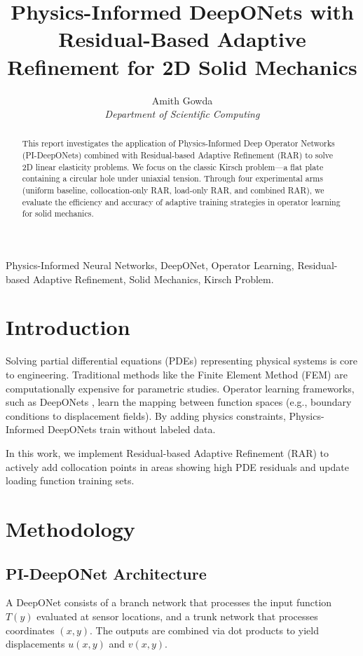 \documentclass[twocolumn,10pt,journal,compsoc]{IEEEtran}
\begin{document}
\title{Physics-Informed DeepONets with Residual-Based Adaptive Refinement for 2D Solid Mechanics}

\author{Amith Gowda \\
\textit{Department of Scientific Computing}
}

\maketitle

\begin{abstract}
This report investigates the application of Physics-Informed Deep Operator Networks (PI-DeepONets) combined with Residual-based Adaptive Refinement (RAR) to solve 2D linear elasticity problems. We focus on the classic Kirsch problem—a flat plate containing a circular hole under uniaxial tension. Through four experimental arms (uniform baseline, collocation-only RAR, load-only RAR, and combined RAR), we evaluate the efficiency and accuracy of adaptive training strategies in operator learning for solid mechanics.
\end{abstract}

\begin{IEEEkeywords}
Physics-Informed Neural Networks, DeepONet, Operator Learning, Residual-based Adaptive Refinement, Solid Mechanics, Kirsch Problem.
\end{IEEEkeywords}

\section{Introduction}
Solving partial differential equations (PDEs) representing physical systems is core to engineering. Traditional methods like the Finite Element Method (FEM) are computationally expensive for parametric studies. Operator learning frameworks, such as DeepONets \cite{lu2021learning}, learn the mapping between function spaces (e.g., boundary conditions to displacement fields). By adding physics constraints, Physics-Informed DeepONets \cite{wang2021learning} train without labeled data.

In this work, we implement Residual-based Adaptive Refinement (RAR) to actively add collocation points in areas showing high PDE residuals and update loading function training sets.

\section{Methodology}
\subsection{PI-DeepONet Architecture}
A DeepONet consists of a branch network that processes the input function $T(y)$ evaluated at sensor locations, and a trunk network that processes coordinates $(x,y)$. The outputs are combined via dot products to yield displacements $u(x,y)$ and $v(x,y)$.
\end{document}
